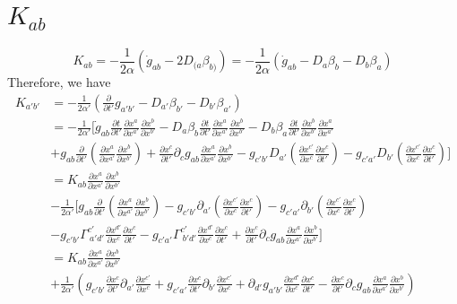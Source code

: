 \documentclass{article}
\begin{document}
\section{$K_{ab}$}
\[
K_{ab} = -\frac{1}{2\alpha}({\dot g}_{ab} - 2 D_{(a}\beta_{b)}) = -\frac{1}{2\alpha}({\dot g}_{ab} - D_{a}\beta_{b} - D_{b}\beta_{a})
\]
Therefore, we have
\begin{align*}
K_{a'b'} & = -\frac{1}{2\alpha'}(\frac{\partial}{\partial t'}g_{a'b'} - D_{a'}\beta_{b'} - D_{b'}\beta_{a'})\\
& = -\frac{1}{2\alpha'}[{\dot g}_{ab}\frac{\partial t}{\partial t'}\frac{\partial x^{a}}{\partial x^{a'}}\frac{\partial x^{b}}{\partial x^{b'}} - D_{a}\beta_{b}\frac{\partial t}{\partial t'}\frac{\partial x^{a}}{\partial x^{a'}}\frac{\partial x^{b}}{\partial x^{b'}} - D_{b}\beta_{a}\frac{\partial t}{\partial t'}\frac{\partial x^{b}}{\partial x^{b'}}\frac{\partial x^{a}}{\partial x^{a'}}\\
& + g_{ab}\frac{\partial}{\partial t'}(\frac{\partial x^{a}}{\partial x^{a'}}\frac{\partial x^{b}}{\partial x^{b'}}) +  \frac{\partial x^{c}}{\partial t'}\partial_{c}g_{ab}\frac{\partial x^{a}}{\partial x^{a'}}\frac{\partial x^{b}}{\partial x^{b'}} - g_{c'b'}D_{a'}(\frac{\partial x^{c'}}{\partial x^{c}}\frac{\partial x^{c}}{\partial t'}) - g_{c'a'}D_{b'}(\frac{\partial x^{c'}}{\partial x^{c}}\frac{\partial x^{c}}{\partial t'})]\\
& = K_{ab}\frac{\partial x^{a}}{\partial x^{a'}}\frac{\partial x^{b}}{\partial x^{b'}}\\
& - \frac{1}{2\alpha'}[g_{ab}\frac{\partial}{\partial t'}(\frac{\partial x^{a}}{\partial x^{a'}}\frac{\partial x^{b}}{\partial x^{b'}}) - g_{c'b'}\partial_{a'}(\frac{\partial x^{c'}}{\partial x^{c}}\frac{\partial x^{c}}{\partial t'})  - g_{c'a'}\partial_{b'}(\frac{\partial x^{c'}}{\partial x^{c}}\frac{\partial x^{c}}{\partial t'})\\
&  - g_{c'b'}\Gamma^{c'}_{~a'd'}\frac{\partial x^{d'}}{\partial x^{c}}\frac{\partial x^{c}}{\partial t'} - g_{c'a'}\Gamma^{c'}_{~b'd'}\frac{\partial x^{d'}}{\partial x^{c}}\frac{\partial x^{c}}{\partial t'} + \frac{\partial x^{c}}{\partial t'}\partial_{c}g_{ab}\frac{\partial x^{a}}{\partial x^{a'}}\frac{\partial x^{b}}{\partial x^{b'}}]\\
& = K_{ab}\frac{\partial x^{a}}{\partial x^{a'}}\frac{\partial x^{b}}{\partial x^{b'}}\\
& + \frac{1}{2\alpha'}(g_{c'b'}\frac{\partial x^{c}}{\partial t'}\partial_{a'}\frac{\partial x^{c'}}{\partial x^{c}} + g_{c'a'}\frac{\partial x^{c}}{\partial t'}\partial_{b'}\frac{\partial x^{c'}}{\partial x^{c}} + \partial_{d'}g_{a'b'}\frac{\partial x^{d'}}{\partial x^{c}}\frac{\partial x^{c}}{\partial t'} - \frac{\partial x^{c}}{\partial t'}\partial_{c}g_{ab}\frac{\partial x^{a}}{\partial x^{a'}}\frac{\partial x^{b}}{\partial x^{b'}})\\

\end{align*}
\end{document}
